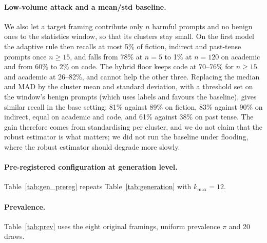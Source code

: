 \documentclass[11pt]{article}
\begin{document}
\begin{table}[t]
\centering
\resizebox{\columnwidth}{!}{}
\caption{Qwen3Guard-Gen-4B as an input guard on the wrapped test prompts. FPR is for the verdict; ASR uses Qwen2.5-1.5B responses (base64 omitted, judge artefact).}
\label{tab:guard}
\end{table}

\paragraph{Low-volume attack and a mean/std baseline.}
We also let a target framing contribute only $n$ harmful prompts and no benign ones to the statistics window, so that its clusters stay small. On the first model the adaptive rule then recalls at most 5\% of fiction, indirect and past-tense prompts once $n\ge 15$, and falls from 78\% at $n{=}5$ to 1\% at $n{=}120$ on academic and from 60\% to 2\% on code. The hybrid floor keeps code at 70--76\% for $n\ge 15$ and academic at 26--82\%, and cannot help the other three. Replacing the median and MAD by the cluster mean and standard deviation, with a threshold set on the window's benign prompts (which uses labels and favours the baseline), gives similar recall in the base setting: 81\% against 89\% on fiction, 83\% against 90\% on indirect, equal on academic and code, and 61\% against 38\% on past tense. The gain therefore comes from standardising per cluster, and we do not claim that the robust estimator is what matters; we did not run the baseline under flooding, where the robust estimator should degrade more slowly.

\paragraph{Pre-registered configuration at generation level.}
Table~\ref{tab:gen_prereg} repeats Table~\ref{tab:generation} with $k_{\max}{=}12$.

\begin{table}[h]
\centering
\resizebox{\columnwidth}{!}{}
\caption{As Table~\ref{tab:generation}, pre-registered $k_{\max}{=}12$, 20 windows.}
\label{tab:gen_prereg}
\end{table}

\paragraph{Prevalence.}
Table~\ref{tab:prev} uses the eight original framings, uniform prevalence $\pi$ and 20 draws.
\end{document}
